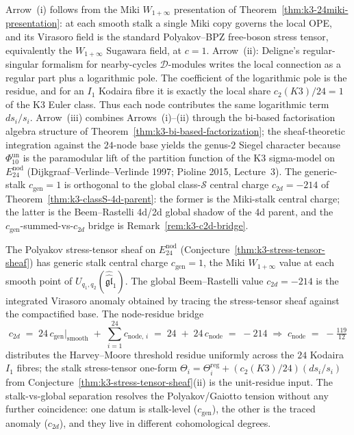 \begin{remark}
\label{rem:k3-stress-tensor-sheaf-evidence}
Arrow~(i) follows from the Miki $W_{1+\infty}$ presentation of
Theorem~\ref{thm:k3-24miki-presentation}: at each smooth stalk a single Miki
copy governs the local OPE, and its Virasoro field is the standard Polyakov--BPZ
free-boson stress tensor, equivalently the $W_{1+\infty}$ Sugawara field, at
$c = 1$. Arrow~(ii): Deligne's regular-singular
formalism for nearby-cycles $\mathcal{D}$-modules writes the local connection as a
regular part plus a logarithmic pole. The coefficient of the logarithmic pole is the
residue, and for an $I_1$ Kodaira fibre it is exactly the local share
$c_2(K3)/24 = 1$ of the K3 Euler class. Thus each node contributes the same logarithmic
term $ds_i/s_i$. Arrow~(iii) combines Arrows~(i)--(ii) through the bi-based factorisation
algebra structure of Theorem~\ref{thm:k3-bi-based-factorization}; the sheaf-theoretic
integration against the $24$-node base yields the genus-$2$ Siegel character
because \(\Phi_{10}^{\mathrm{un}}\) is the paramodular lift of the partition function of the
K3 sigma-model on $E^{\mathrm{nod}}_{24}$ (Dijkgraaf--Verlinde--Verlinde 1997;
Pioline 2015, Lecture~3). The generic-stalk $c_{\mathrm{gen}} = 1$ is
orthogonal to the global class-$\mathcal{S}$ central charge $c_{2d} = -214$
of Theorem~\ref{thm:k3-classS-4d-parent}: the former is the Miki-stalk
central charge; the latter is the Beem--Rastelli 4d/2d global shadow of the
4d parent, and the $c_{\mathrm{gen}}$-summed-vs-$c_{2d}$ bridge is
Remark~\ref{rem:k3-c2d-bridge}.
\end{remark}

\begin{remark}[Stalk \texorpdfstring{$c_{\mathrm{gen}} = 1$}{c-gen = 1} versus global \texorpdfstring{$c_{2d} = -214$}{c-2d = -214}]
\label{rem:k3-c2d-bridge}
The Polyakov stress-tensor sheaf on $E^{\mathrm{nod}}_{24}$
(Conjecture~\ref{thm:k3-stress-tensor-sheaf}) has generic stalk central charge
$c_{\mathrm{gen}} = 1$, the Miki $W_{1+\infty}$ value at each smooth point
of $U_{q_1,q_2}(\widehat{\widehat{\mathfrak{gl}}}_1)$. The global
Beem--Rastelli value $c_{2d} = -214$ is the integrated Virasoro anomaly
obtained by tracing the stress-tensor sheaf against the compactified base.
The node-residue bridge
\[
 c_{2d}
 \;=\;
 24\,c_{\mathrm{gen}}\big|_{\mathrm{smooth}}
 \;+\;
 \sum_{i=1}^{24} c_{\mathrm{node},\,i}
 \;=\;
 24 \;+\; 24\,c_{\mathrm{node}}
 \;=\;
 -214
 \;\Longrightarrow\;
 c_{\mathrm{node}}
 \;=\;
 -\tfrac{119}{12}
\]
distributes the Harvey--Moore threshold residue uniformly across the $24$
Kodaira $I_1$ fibres; the stalk stress-tensor one-form
$\Theta_i = \Theta_i^{\mathrm{reg}} + (c_2(K3)/24)(ds_i/s_i)$ from
Conjecture~\ref{thm:k3-stress-tensor-sheaf}(ii) is the unit-residue input.
The stalk-vs-global separation resolves the Polyakov/Gaiotto tension
without any further coincidence: one datum is stalk-level ($c_{\mathrm{gen}}$),
the other is the traced anomaly ($c_{2d}$), and they live in different
cohomological degrees.
\end{remark}

